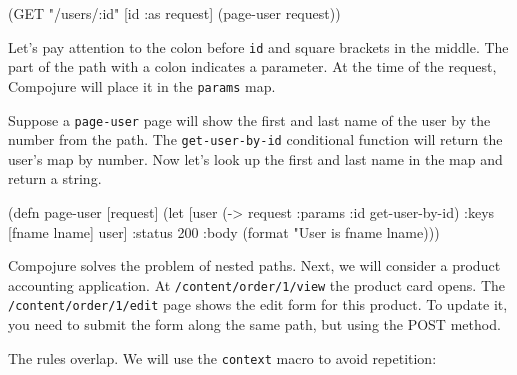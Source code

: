 \begin{english}
  \begin{clojure}
(GET "/users/:id" [id :as request] (page-user request))
  \end{clojure}
\end{english}

\fi

Let's pay attention to the colon before \verb|id| and square brackets in the middle.
The part of the path with a colon indicates a parameter. At the time of the request, Compojure will place it in the \verb|params| map.

Suppose a \verb|page-user| page will show the first and last name of the user by the number from the path. The \verb|get-user-by-id| conditional function will return the user's map by number. Now let's look up the first and last name in the map and return a string.

\ifx\DEVICETYPE\MOBILE

\begin{english}
  \begin{clojure}
(defn page-user [request]
   (let [user (-> request
                  :params
                  :id
                  get-user-by-id)
         {:keys [fname lname]} user]
     {:status 200
      :body (format "User is %
                    fname lname)}))
  \end{clojure}
\end{english}

\else

\begin{english}
\end{english}

\fi

Compojure solves the problem of nested paths. Next, we will consider a product accounting application. At \verb|/content/order/1/view| the product card opens. The \verb|/content/order/1/edit| page shows the edit form for this product. To update it, you need to submit the form along the same path, but using the POST method.

The rules overlap. We will use the \verb|context| macro to avoid repetition:


